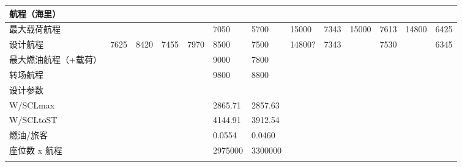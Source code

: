 \documentclass[12pt,a4paper]{report}
\begin{document}
\begin{landscape}
\begin{center}
\begin{longtable}{|p{1.5cm}|p{1.3cm}|p{1.1cm}|p{1.1cm}|p{1.1cm}|p{1.1cm}|p{1.1cm}|p{1.1cm}|p{1.1cm}|p{1.1cm}|p{1.1cm}|p{1.1cm}|p{1.1cm}|}
航程（海里）	&		&		&		&		&		&		&		&		&		&		&		&		\\ \hline
最大载荷航程	&		&		&		&		&	7050	&	5700	&	15000	&	7343	&	15000	&	7613	&	14800	&	6425	\\ \hline
设计航程	&	7625	&	8420	&	7455	&	7970	&	8500	&	7500	&	14800?	&	7343	&		&	7530	&		&	6345	\\ \hline
最大燃油航程（+载荷）	&		&		&		&		&	9000	&	7800	&		&		&		&		&		&		\\ \hline
转场航程 	&		&		&		&		&	9800	&	8800	&		&		&		&		&		&		\\ \hline
设计参数	&		&		&		&		&		&		&		&		&		&		&		&		\\ \hline
W/SCLmax	&		&		&		&		&	2865.71	&	2857.63	&		&		&		&		&		&		\\ \hline
W/SCLtoST	&		&		&		&		&	4144.91	&	3912.54	&		&		&		&		&		&		\\ \hline
燃油/旅客	&		&		&		&		&	0.0554	&	0.0460	&		&		&		&		&		&		\\ \hline
座位数 x 航程	&		&		&		&		&	2975000	&	3300000	&		&		&		&		&		&		\\ \hline
\hline
\label{nosegearpars} 
\end{longtable}
\end{center}
\end{landscape}
\end{document}
